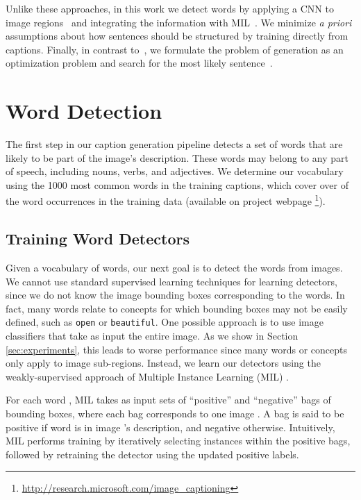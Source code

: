 \documentclass[10pt,twocolumn,letterpaper]{article}
\begin{document}
Unlike these approaches, in this work we detect words by applying a CNN to image regions~\cite{girshickCVPR14} and integrating the information with MIL~\cite{zhangNIPS05}. We minimize {\it a priori} assumptions about how sentences should be structured by training directly from captions. Finally, in contrast to~\cite{kiros2013multimodal,mao2014explain}, we formulate the problem of generation as an optimization problem and search for the most likely sentence~\cite{ratnaparkhi2002trainable}.

\section{Word Detection}\label{sec:object_detection}

The first step in our caption generation pipeline detects a set of words that are likely to be part of the image's description. These words may belong to any part of speech, including nouns, verbs, and adjectives. We determine our vocabulary  using the 1000 most common words in the training captions, which cover over  of the word occurrences in the training data (available on project webpage \footnote{\label{website}\url{http://research.microsoft.com/image_captioning}}).

\subsection{Training Word Detectors}
Given a vocabulary of words, our next goal is to detect the words from images. We cannot use standard supervised learning techniques for learning detectors, since we do not know the image bounding boxes corresponding to the words. In fact, many words relate to concepts for which bounding boxes may not be easily defined, such as \texttt{open} or \texttt{beautiful}. One possible approach is to use image classifiers that take as input the entire image. As we show in Section \ref{sec:experiments}, this leads to worse performance since many words or concepts only apply to image sub-regions. Instead, we learn our detectors using the weakly-supervised approach of Multiple Instance Learning (MIL) \cite{maron98,zhangNIPS05}.

For each word , MIL takes as input sets of ``positive'' and ``negative'' bags of bounding boxes, where each bag corresponds to one image . A bag  is said to be positive if word  is in image 's description, and negative otherwise. Intuitively, MIL performs training by iteratively selecting instances within the positive bags, followed by retraining the detector using the updated positive labels.
\end{document}
